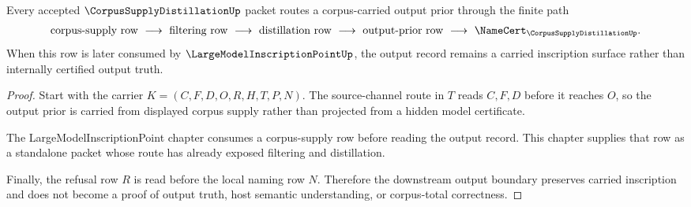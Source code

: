 \begin{theorem}
\label{thm:corpus-supply-distillation-carried-output-boundary}
Every accepted $\CorpusSupplyDistillationUp$ packet routes a corpus-carried output prior through the finite path
$$
\begin{gathered}
\text{corpus-supply row}\ \longrightarrow\ \text{filtering row}\ \longrightarrow\ \text{distillation row}\ \longrightarrow\ \text{output-prior row}\ \longrightarrow\ \NameCert_{\CorpusSupplyDistillationUp}.
\end{gathered}
$$
When this row is later consumed by $\LargeModelInscriptionPointUp$, the output record remains a carried inscription surface rather than internally certified output truth.
\end{theorem}
\begin{proof}
Start with the carrier $K=(C,F,D,O,R,H,T,P,N)$. The source-channel route in $T$ reads $C,F,D$ before it reaches $O$, so the output prior is carried from displayed corpus supply rather than projected from a hidden model certificate.

The LargeModelInscriptionPoint chapter consumes a corpus-supply row before reading the output record. This chapter supplies that row as a standalone packet whose route has already exposed filtering and distillation.

Finally, the refusal row $R$ is read before the local naming row $N$. Therefore the downstream output boundary preserves carried inscription and does not become a proof of output truth, host semantic understanding, or corpus-total correctness.
\end{proof}

